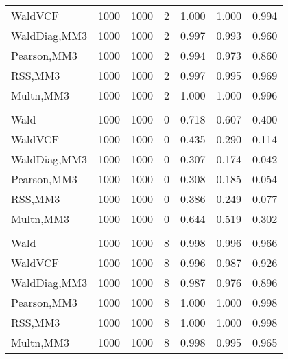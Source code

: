 \documentclass[
]{article}
\begin{document}
\begin{table}[H]
{\begin{tabular}[t]{lrrrrrr}
\hspace{1em}WaldVCF & 1000 & 1000 & 2 & 1.000 & 1.000 & 0.994\\
\hspace{1em}WaldDiag,MM3 & 1000 & 1000 & 2 & 0.997 & 0.993 & 0.960\\
\hspace{1em}Pearson,MM3 & 1000 & 1000 & 2 & 0.994 & 0.973 & 0.860\\
\hspace{1em}RSS,MM3 & 1000 & 1000 & 2 & 0.997 & 0.995 & 0.969\\
\hspace{1em}Multn,MM3 & 1000 & 1000 & 2 & 1.000 & 1.000 & 0.996\\
\addlinespace[0.3em]
\multicolumn{7}{l}{\textbf{2F 10V}}\\
\hspace{1em}Wald & 1000 & 1000 & 0 & 0.718 & 0.607 & 0.400\\
\hspace{1em}WaldVCF & 1000 & 1000 & 0 & 0.435 & 0.290 & 0.114\\
\hspace{1em}WaldDiag,MM3 & 1000 & 1000 & 0 & 0.307 & 0.174 & 0.042\\
\hspace{1em}Pearson,MM3 & 1000 & 1000 & 0 & 0.308 & 0.185 & 0.054\\
\hspace{1em}RSS,MM3 & 1000 & 1000 & 0 & 0.386 & 0.249 & 0.077\\
\hspace{1em}Multn,MM3 & 1000 & 1000 & 0 & 0.644 & 0.519 & 0.302\\
\addlinespace[0.3em]
\multicolumn{7}{l}{\textbf{3F 15V}}\\
\hspace{1em}Wald & 1000 & 1000 & 8 & 0.998 & 0.996 & 0.966\\
\hspace{1em}WaldVCF & 1000 & 1000 & 8 & 0.996 & 0.987 & 0.926\\
\hspace{1em}WaldDiag,MM3 & 1000 & 1000 & 8 & 0.987 & 0.976 & 0.896\\
\hspace{1em}Pearson,MM3 & 1000 & 1000 & 8 & 1.000 & 1.000 & 0.998\\
\hspace{1em}RSS,MM3 & 1000 & 1000 & 8 & 1.000 & 1.000 & 0.998\\
\hspace{1em}Multn,MM3 & 1000 & 1000 & 8 & 0.998 & 0.995 & 0.965\\
\bottomrule
\end{tabular}}
\endgroup{}
\end{table}
\end{document}
